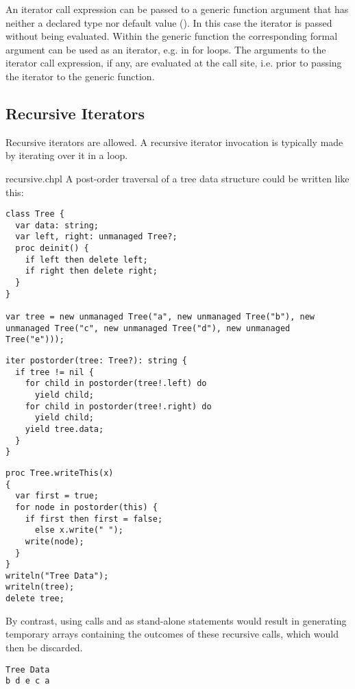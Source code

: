 An iterator call expression can be passed to a generic function argument that
has neither a declared type nor default value
().
In this case the iterator is passed without being evaluated.
Within the generic function the corresponding formal argument
can be used as an iterator, e.g. in for loops.
The arguments to the iterator call expression, if any, are evaluated
at the call site, i.e. prior to passing the iterator to the generic function.

\subsection{Recursive Iterators}
\label{Recursive_Iterators}

Recursive iterators are allowed. A recursive iterator invocation is
typically made by iterating over it in a loop.


\begin{chapelexample}{recursive.chpl}
A post-order traversal of a tree data structure could be written like this:
\begin{chapelnoprint}
\begin{verbatim}
class Tree {
  var data: string;
  var left, right: unmanaged Tree?;
  proc deinit() {
    if left then delete left;
    if right then delete right;
  }
}

var tree = new unmanaged Tree("a", new unmanaged Tree("b"), new unmanaged Tree("c", new unmanaged Tree("d"), new unmanaged Tree("e")));
\end{verbatim}
\end{chapelnoprint}
\begin{chapel}
\begin{verbatim}
iter postorder(tree: Tree?): string {
  if tree != nil {
    for child in postorder(tree!.left) do
      yield child;
    for child in postorder(tree!.right) do
      yield child;
    yield tree.data;
  }
}
\end{verbatim}
\end{chapel}
\begin{chapelnoprint}
\begin{verbatim}
proc Tree.writeThis(x)
{
  var first = true;
  for node in postorder(this) {
    if first then first = false;
      else x.write(" ");
    write(node);
  }
}
writeln("Tree Data");
writeln(tree);
delete tree;
\end{verbatim}
\end{chapelnoprint}
By contrast, using calls 
and  as stand-alone statements would
result in generating temporary arrays containing the outcomes of these
recursive calls, which would then be discarded.
\begin{chapeloutput}
\begin{verbatim}
Tree Data
b d e c a
\end{verbatim}
\end{chapeloutput}
\end{chapelexample}

